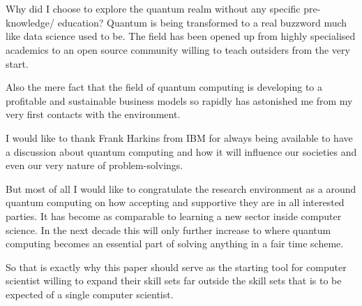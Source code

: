 
\chapter*{}
\label{ch:voorwoord}


Why did I choose to explore the quantum realm without any specific pre-knowledge/ education? Quantum is being transformed to a real buzzword much like data science used to be. The field has been opened up from highly specialised academics to an open source community willing to teach outsiders from the very start.

Also the mere fact that the field of quantum computing is developing to a profitable and sustainable business models so rapidly has astonished me from my very first contacts with the environment.

 I would like to thank Frank Harkins from IBM for always being available to have a discussion about quantum computing and how it will influence our societies and even our very nature of problem-solvings. 
 
 But most of all I would like to congratulate the research environment as a around quantum computing on how accepting and supportive they are in all interested parties. It has become as comparable to learning a new sector inside computer science. In the next decade this will only further increase to where quantum computing becomes an essential part of solving anything in a fair time scheme.
 
 So that is exactly why this paper should serve as the starting tool for computer scientist willing to expand their skill sets far outside the skill sets that is to be expected of a single computer scientist. 
